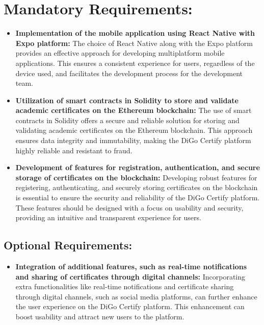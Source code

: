 \section{Mandatory Requirements:}

\begin{itemize}

    \item \textbf{Implementation of the mobile application using React Native with Expo platform:} The choice of React Native along with the Expo platform provides an effective approach for developing multiplatform mobile applications. This ensures a consistent experience for users, regardless of the device used, and facilitates the development process for the development team.

    \item \textbf{Utilization of smart contracts in Solidity to store and validate academic certificates on the Ethereum blockchain:} The use of smart contracts in Solidity offers a secure and reliable solution for storing and validating academic certificates on the Ethereum blockchain. This approach ensures data integrity and immutability, making the DiGo Certify platform highly reliable and resistant to fraud.

    \item \textbf{Development of features for registration, authentication, and secure storage of certificates on the blockchain:} Developing robust features for registering, authenticating, and securely storing certificates on the blockchain is essential to ensure the security and reliability of the DiGo Certify platform. These features should be designed with a focus on usability and security, providing an intuitive and transparent experience for users.

\end{itemize}

\subsection{Optional Requirements:}

\begin{itemize}

    \item \textbf{Integration of additional features, such as real-time notifications and sharing of certificates through digital channels:} Incorporating extra functionalities like real-time notifications and certificate sharing through digital channels, such as social media platforms, can further enhance the user experience on the DiGo Certify platform. This enhancement can boost usability and attract new users to the platform.

\end{itemize}

